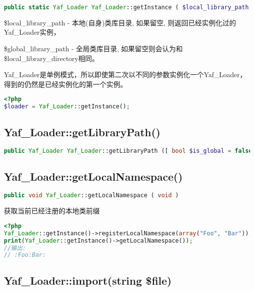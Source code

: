 \begin{lstlisting}[language=PHP]
public static Yaf_Loader Yaf_Loader::getInstance ( $local_library_path,$global_library_path)
\end{lstlisting}


\begin{compactitem}
\item \$local\_library\_path - 本地(自身)类库目录, 如果留空, 则返回已经实例化过的Yaf\_Loader实例，
\item \$global\_library\_path - 全局类库目录, 如果留空则会认为和\$local\_library\_directory相同。
\end{compactitem}

Yaf\_Loader是单例模式，所以即使第二次以不同的参数实例化一个Yaf\_Loader，得到的仍然是已经实例化的第一个实例。

\begin{lstlisting}[language=PHP]
<?php
$loader = Yaf_Loader::getInstance();
\end{lstlisting}


\subsection{Yaf\_Loader::getLibraryPath()}

\begin{lstlisting}[language=PHP]
public Yaf_Loader Yaf_Loader::getLibraryPath ([ bool $is_global = false ] )
\end{lstlisting}


\subsection{Yaf\_Loader::getLocalNamespace()}

\begin{lstlisting}[language=PHP]
public void Yaf_Loader::getLocalNamespace ( void )
\end{lstlisting}

获取当前已经注册的本地类前缀

\begin{lstlisting}[language=PHP]
<?php
Yaf_Loader::getInstance()->registerLocalNamespace(array("Foo", "Bar"));
print(Yaf_Loader::getInstance()->getLocalNamespace());
//输出:
// :Foo:Bar:
\end{lstlisting}


\subsection{Yaf\_Loader::import(string \$file)}


